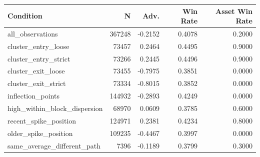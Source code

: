 \begin{tabular}{lrrrr}
\toprule
Condition & N & Adv. & Win Rate & Asset Win Rate \\
\midrule
all\_observations & 367248 & -0.2152 & 0.4078 & 0.2000 \\
cluster\_entry\_loose & 73457 & 0.2464 & 0.4495 & 0.9000 \\
cluster\_entry\_strict & 73266 & 0.2445 & 0.4496 & 0.9000 \\
cluster\_exit\_loose & 73455 & -0.7975 & 0.3851 & 0.0000 \\
cluster\_exit\_strict & 73334 & -0.8015 & 0.3852 & 0.0000 \\
inflection\_points & 144932 & -0.2893 & 0.4249 & 0.0000 \\
high\_within\_block\_dispersion & 68970 & 0.0609 & 0.3785 & 0.6000 \\
recent\_spike\_position & 124971 & 0.2381 & 0.4234 & 0.8000 \\
older\_spike\_position & 109235 & -0.4467 & 0.3997 & 0.0000 \\
same\_average\_different\_path & 7396 & -0.1189 & 0.3799 & 0.3000 \\
\bottomrule
\end{tabular}

